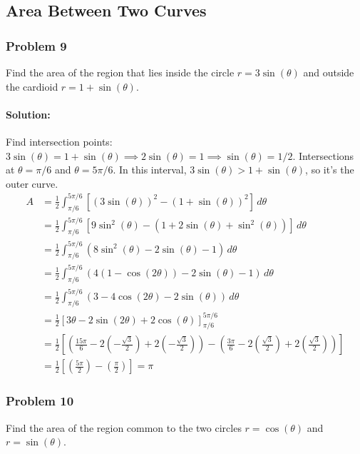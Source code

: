 \documentclass{article}
\begin{document}

\subsection*{Area Between Two Curves}

\subsubsection*{Problem 9}
Find the area of the region that lies inside the circle $r = 3\sin(\theta)$ and outside the cardioid $r = 1 + \sin(\theta)$.
\paragraph{Solution:}
Find intersection points: $3\sin(\theta) = 1 + \sin(\theta) \implies 2\sin(\theta) = 1 \implies \sin(\theta) = 1/2$.
Intersections at $\theta = \pi/6$ and $\theta = 5\pi/6$. In this interval, $3\sin(\theta) > 1+\sin(\theta)$, so it's the outer curve.
\begin{align*} A &= \frac{1}{2} \int_{\pi/6}^{5\pi/6} \left[ (3\sin(\theta))^2 - (1 + \sin(\theta))^2 \right] \,d\theta \\ &= \frac{1}{2} \int_{\pi/6}^{5\pi/6} [9\sin^2(\theta) - (1 + 2\sin(\theta) + \sin^2(\theta))] \,d\theta \\ &= \frac{1}{2} \int_{\pi/6}^{5\pi/6} (8\sin^2(\theta) - 2\sin(\theta) - 1) \,d\theta \\ &= \frac{1}{2} \int_{\pi/6}^{5\pi/6} (4(1-\cos(2\theta)) - 2\sin(\theta) - 1) \,d\theta \\ &= \frac{1}{2} \int_{\pi/6}^{5\pi/6} (3 - 4\cos(2\theta) - 2\sin(\theta)) \,d\theta \\ &= \frac{1}{2} [3\theta - 2\sin(2\theta) + 2\cos(\theta)]_{\pi/6}^{5\pi/6} \\ &= \frac{1}{2} \left[ \left(\frac{15\pi}{6} - 2(-\frac{\sqrt{3}}{2}) + 2(-\frac{\sqrt{3}}{2})\right) - \left(\frac{3\pi}{6} - 2(\frac{\sqrt{3}}{2}) + 2(\frac{\sqrt{3}}{2})\right) \right] \\ &= \frac{1}{2} \left[ (\frac{5\pi}{2}) - (\frac{\pi}{2}) \right] = \pi \end{align*}

\subsubsection*{Problem 10}
Find the area of the region common to the two circles $r = \cos(\theta)$ and $r = \sin(\theta)$.
\end{document}
